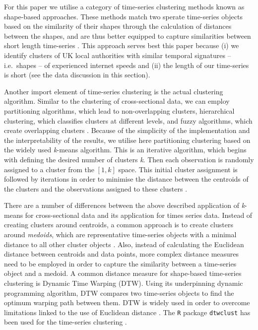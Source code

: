 \documentclass[,]{sagej}
\begin{document}
For this paper we utilise a category of time-series clustering methods
known as shape-based approaches. These methods match two sperate
time-series objects based on the similarity of their shapes through the
calculation of distances between the shapes, and are thus better
equipped to capture similarities between short length time-series
\citep{aghabozorgi2015time}. This approach serves best this paper
because (i) we identify clusters of UK local authorities with similar
temporal signatures -- i.e.~shapes -- of experienced internet speeds and
(ii) the length of our time-series is short (see the data discussion in
this section).

Another import element of time-series clustering is the actual
clustering algorithm. Similar to the clustering of cross-sectional data,
we can employ partitioning algorithms, which lead to non-overlapping
clusters, hierarchical clustering, which classifies clusters at
different levels, and fuzzy algorithms, which create overlapping
clusters \citep{sardatime}. Because of the simplicity of the
implementation and the interpretability of the results, we utilise here
partitioning clustering based on the widely used \emph{k}-means
algorithm. This is an iterative algorithm, which begins with defining
the desired number of clusters \emph{k}. Then each observation is
randomly assigned to a cluster from the \([1,k]\) space. This initial
cluster assignment is followed by iterations in order to minimise the
distance between the centroids of the clusters and the observations
assigned to these clusters \citep{james2013introduction}.

There are a number of differences between the above described
application of \emph{k}-means for cross-sectional data and its
application for times series data. Instead of creating clusters around
centroids, a common approach is to create clusters around
\emph{medoids}, which are representative time-series objects with a
minimal distance to all other cluster objects \citep{sardatime}. Also,
instead of calculating the Euclidean distance between centroids and data
points, more complex distance measures need to be employed in order to
capture the similarity between a time-series object and a medoid. A
common distance measure for shape-based time-series clustering is
Dynamic Time Warping (DTW). Using its underpinning dynamic programming
algorithm, DTW compares two time-series objects to find the optimum
warping path between them. DTW is widely used in order to overcome
limitations linked to the use of Euclidean distance
\citep{sardatime, berndt1994using, ratanamahatana2004everything}. The
\texttt{R} package \texttt{dtwclust} has been used for the time-series
clustering \citep{dtwclust}.
\end{document}
